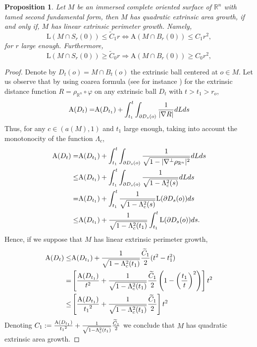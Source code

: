 \documentclass[a4paper]{amsart}
\newtheorem{proposition}[theorem]{Proposition}
\theoremstyle{definition}
\numberwithin{equation}{section}
\begin{document}
\begin{proposition}\label{prop3.2}
Let $M$ be an immersed complete oriented  surface of $\mathbb{R}^{n}$ with tamed second fundamental form, then $M$ has quadratic extrinsic area growth, if and only if, $M$ has linear extrinsic perimeter growth. Namely,
$$
\text{L}(M\cap S_r(0))\leq \widetilde  C_1 r\Longleftrightarrow\text{A}(M\cap B_r(0))\leq C_1r^2,
$$ 
for $r$ large enough. Furthermore, 
$$
\text{L}(M\cap S_r(0))\geq \widetilde C_0 r\Longrightarrow\text{A}(M\cap B_r(0))\geq C_0r^2,
$$ 
\end{proposition}
\begin{proof}
Denote by $D_t(o)=M\cap B_t(o)$ the extrinsic ball centered at $o\in M$. Let us observe that by using coarea formula (see for instance \cite{Sakai}) for the extrinsic distance function $R=\rho_{{\mathbb{R}}^n}\circ \varphi$ on any extrinsic ball $D_t$ with $t>t_1>r_o$, 
\begin{equation}\label{coarea1}
\begin{aligned}
{\rm A}(D_{t})=&{\rm A}(D_{t_1})+\int_{t_1}^{t}\int_{\partial D_s(o)}\frac{1}{\vert \nabla R\vert}dLds\\
\end{aligned}
\end{equation}
Thus, for any $c\in (a(M),1)$ and $t_1$ large enough, taking into account the monotonocity of the function $\Lambda_c$,
\begin{equation}
\begin{aligned}
{\rm A}(D_{t})=&{\rm A}(D_{t_1})+\int_{t_1}^{t}\int_{\partial D_s(o)}\frac{1}{\sqrt{1-\vert \nabla^\perp {{\rho_{{\mathbb{R}}^n}}} \vert^2}}dLds\\
\leq& {\rm A}(D_{t_1})+\int_{t_1}^{t}\int_{\partial D_s(o)}\frac{1}{\sqrt{1-\Lambda_c^2(s)}}dLds\\
=&{\rm A}(D_{t_1})+\int_{t_1}^{t}\frac{1}{\sqrt{1-\Lambda_c^2(s)}}{\rm L}(\partial D_s(o))ds\\
\leq &{\rm A}(D_{t_1})+\frac{1}{\sqrt{1-\Lambda_c^2(t_1)}}\int_{t_1}^{t}{\rm L}(\partial D_s(o))ds.
\end{aligned}
\end{equation}
Hence, if we suppose that $M$ has linear extrinsic perimeter growth,
\begin{equation}
\begin{aligned}
{\rm A}(D_t)\leq & {\rm A}(D_{t_1})+\frac{1}{\sqrt{1-\Lambda_c^2(t_1)}}\frac{\widetilde C_1}{2}(t^2-t_1^2)\\
=&\left[\frac{{\rm A}(D_{t_1})}{t^2}+\frac{1}{\sqrt{1-\Lambda_c^2(t_1)}}\frac{\widetilde C_1}{2}\left(1-\left(\frac{t_1}{t}\right)^2\right)\right]t^2\\
\leq & \left[\frac{{\rm A}(D_{t_1})}{{t_1}^2}+\frac{1}{\sqrt{1-\Lambda_c^2(t_1)}}\frac{\widetilde C_1}{2}\right]t^2
\end{aligned}
\end{equation}
Denoting $C_1:=\frac{{\rm A}(D_{t_1})}{{t_1}^2}+\frac{1}{\sqrt{1-\Lambda_c^2(t_1)}}\frac{\widetilde C_1}{2}$ we conclude that $M$ has quadratic extrinsic area growth. 


\end{proof}
\end{document}

